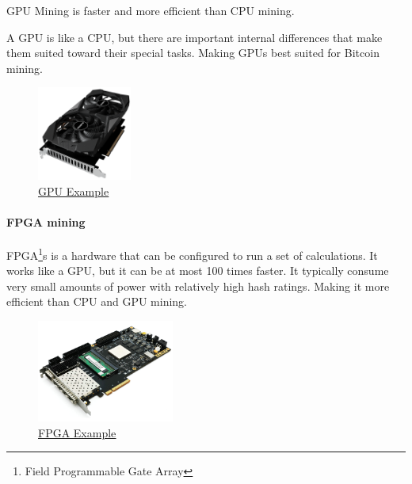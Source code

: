 \documentclass{article}
\begin{document}
GPU Mining is faster and more efficient than CPU mining.

A GPU is like a CPU, but there are important internal differences that make them suited toward their special tasks. Making GPUs best suited for Bitcoin mining.

\begin{figure}[H]
    \begin{center}
        \includegraphics[width=0.275\textwidth]{images/gpu.png}
        \caption{\href{https://wccftech.com/nvidia-cmp-30hx-cryptocurrency-mining-gpu-gigabyte-listed-for-over-700-usd-3-month-warranty/}{\underline{GPU Example}}}
    \end{center}
\end{figure}

\paragraph{FPGA mining}

FPGA\footnote{Field Programmable Gate Array}s is a hardware that can be configured to run a set of calculations. It works like a GPU, but it can be at most 100 times faster. It typically consume very small amounts of power with relatively high hash ratings. Making it more efficient than CPU and GPU mining.

\begin{figure}[H]
    \begin{center}
        \includegraphics[width=0.4\textwidth]{images/fpga.jpeg}
        \caption{\href{https://wccftech.com/nvidia-cmp-30hx-cryptocurrency-mining-gpu-gigabyte-listed-for-over-700-usd-3-month-warranty/}{\underline{FPGA Example}}}
    \end{center}
\end{figure}
\end{document}
